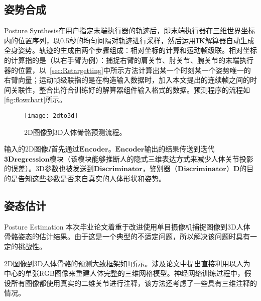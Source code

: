 \subsection{姿势合成}{Posture Synthesis}在用户指定末端执行器的轨迹后，即末端执行器在三维世界坐标内的位置序列，以0.5秒的均匀间隔对轨迹进行采样，然后运用$\mathbf{IK}$解算器自动生成全身姿势。轨迹的生成由两个步骤组成：相对坐标的计算和运动帧级联。相对坐标的计算指的是（以右手臂为例）：捕捉右臂的肩关节、肘关节、腕关节的末端执行器的位置，以~\ref{sec:Retargetting}中所示方法计算出某一个时刻某一个姿势唯一的右臂向量；运动帧级联指的是在构造输入数据时，加入本文提出的连续帧之间的时间关联性，整合出符合训练好的解算器组件输入格式的数据。预测程序的流程如\cref{fig:flowchart}所示。
\begin{figure}[!h]
	\centering
	\texttt{[image: 2dto3d]}
	\caption[]{\label{fig:2dto3d}
	2D图像到3D人体骨骼预测流程\cite{kanazawa2018end}。
	}
\end{figure}输入的2D图像$I$首先通过$\mathbf{Encoder}$。$\mathbf{Encoder}$输出的结果传送到迭代$\mathbf{3D regression}$模块（该模块能够推断人的隐式三维表达方式来减少人体关节投影的误差）。3D参数也被发送到$\mathbf{Discriminator}$，鉴别器（$\mathbf{Discriminator}$）$\mathbf{D}$的目的是告知这些参数是否来自真实的人体形状和姿势。
\subsection{姿态估计}{Posture Estimation}
本次毕业论文着重于改进使用单目摄像机捕捉图像到3D人体骨骼姿态的估计结果\cite{kanazawa2018end}。由于这是一个典型的不适定问题，所以解决该问题时具有一定的挑战性。

2D图像到3D人体骨骼的预测大致框架如\cref{fig:2dto3d}所示。涉及论文中提出直接利用以人为中心的单张RGB图像来重建人体完整的三维网格模型。神经网络训练过程中，假设所有图像都使用真实的二维关节进行注释，该方法还考虑了一些具有三维注释的情况。

